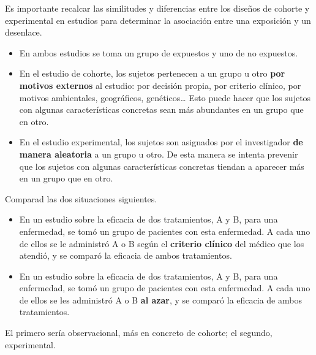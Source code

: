 \documentclass[
]{book}
\theoremstyle{definition}
\theoremstyle{definition}
\theoremstyle{definition}
\theoremstyle{definition}
\theoremstyle{remark}
\begin{document}
Es importante recalcar las similitudes y diferencias entre los diseños de cohorte y experimental en estudios para determinar la asociación entre una exposición y un desenlace.

\begin{itemize}
\item
  En ambos estudios se toma un grupo de expuestos y uno de no expuestos.
\item
  En el estudio de cohorte, los sujetos pertenecen a un grupo u otro \textbf{por motivos externos} al estudio: por decisión propia, por criterio clínico, por motivos ambientales, geográficos, genéticos\ldots{} Esto puede hacer que los sujetos con algunas características concretas sean más abundantes en un grupo que en otro.
\item
  En el estudio experimental, los sujetos son asignados por el investigador \textbf{de manera aleatoria} a un grupo u otro. De esta manera se intenta prevenir que los sujetos con algunas características concretas tiendan a aparecer más en un grupo que en otro.
\end{itemize}

\begin{rmdcaution}
Comparad las dos situaciones siguientes.

\begin{itemize}
\item
  En un estudio sobre la eficacia de dos tratamientos, A y B, para una enfermedad, se tomó un grupo de pacientes con esta enfermedad. A cada uno de ellos se le administró A o B según el \textbf{criterio clínico} del médico que los atendió, y se comparó la eficacia de ambos tratamientos.
\item
  En un estudio sobre la eficacia de dos tratamientos, A y B, para una enfermedad, se tomó un grupo de pacientes con esta enfermedad. A cada uno de ellos se les administró A o B \textbf{al azar}, y se comparó la eficacia de ambos tratamientos.
\end{itemize}

El primero sería observacional, más en concreto de cohorte; el segundo, experimental.
\end{rmdcaution}
\end{document}
